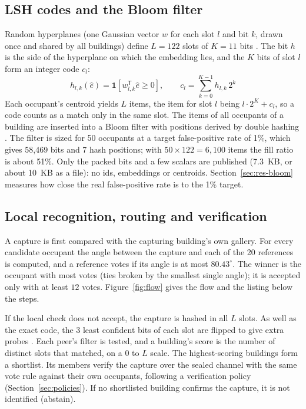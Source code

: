 \documentclass[12pt,a4paper,oneside]{report}
\begin{document}
\subsection{LSH codes and the Bloom filter}
Random hyperplanes (one Gaussian vector $w$ for each slot $l$ and bit $k$, drawn once and shared by all buildings) define $L=122$ slots of $K=11$ bits \cite{ref14}. The bit $h$ is the side of the hyperplane on which the embedding lies, and the $K$ bits of slot $l$ form an integer code $c_l$:
\begin{equation}
h_{l,k}(\hat{e})=\mathbf{1}\!\left[w_{l,k}^{\mathsf{T}}\hat{e}\geq 0\right],\qquad c_l=\sum_{k=0}^{K-1}h_{l,k}\,2^{k}
\end{equation}
Each occupant's centroid yields $L$ items, the item for slot $l$ being $l\cdot 2^{K}+c_l$, so a code counts as a match only in the same slot. The items of all occupants of a building are inserted into a Bloom filter \cite{ref12} with positions derived by double hashing \cite{ref16}. The filter is sized for 50 occupants at a target false-positive rate of 1\%, which gives 58,469 bits and 7 hash positions; with $50\times 122=6{,}100$ items the fill ratio is about 51\%. Only the packed bits and a few scalars are published (7.3~KB, or about 10~KB as a file): no ids, embeddings or centroids. Section~\ref{sec:res-bloom} measures how close the real false-positive rate is to the 1\% target.

\subsection{Local recognition, routing and verification}
A capture is first compared with the capturing building's own gallery. For every candidate occupant the angle between the capture and each of the 20 references is computed, and a reference votes if its angle is at most $80.43^{\circ}$. The winner is the occupant with most votes (ties broken by the smallest single angle); it is accepted only with at least $12$ votes. Figure~\ref{fig:flow} gives the flow and the listing below the steps.

If the local check does not accept, the capture is hashed in all $L$ slots. As well as the exact code, the $3$ least confident bits of each slot are flipped to give extra probes \cite{ref15}. Each peer's filter is tested, and a building's score is the number of distinct slots that matched, on a 0 to $L$ scale. The highest-scoring buildings form a shortlist. Its members verify the capture over the sealed channel with the same vote rule against their own occupants, following a verification policy (Section~\ref{sec:policies}). If no shortlisted building confirms the capture, it is not identified (abstain).
\end{document}
